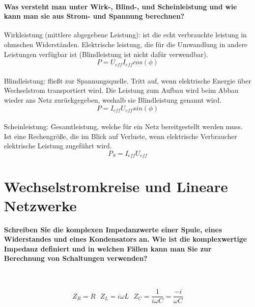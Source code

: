 \documentclass[a4paper, 11pt, parskip=half]{scrartcl}
\begin{document}
\paragraph{Was versteht man unter Wirk-, Blind-, und Scheinleistung und wie kann man sie aus Strom-
und Spannung berechnen?}

Wirkleistung (mittlere abgegebene Leistung): ist die echt verbrauchte leistung in ohmschen Widerständen.  Elektrische leistung, die für die Umwandlung in andere Leistungen verfügbar ist (Blindleistung ist nicht dafür verwendbar). \\
\begin{equation}
P = U_{eff} I_{eff} cos(\phi)
\end{equation}\\

Blindleistung: fließt zur Spannungsquelle. Tritt auf, wenn elektrische Energie über Wechselstrom transportiert wird. Die Leistung zum Aufbau wird beim Abbau wieder ans Netz zurückgegeben, weshalb sie Blindleistung genannt wird.\\
\begin{equation}
P = I_{eff} U_{eff} sin(\phi)
\end{equation}\\

Scheinleistung: Gesamtleistung, welche für ein Netz bereitgestellt werden muss.  Ist eine Rechengröße, die im Blick auf Verluste, wenn elektrische Verbraucher elektrische Leistung zugeführt wird.\\
\begin{equation}
P_S = I_{eff} U_{eff}
\end{equation}

\newpage

\newpage

\section{Wechselstromkreise und Lineare Netzwerke}

\paragraph{Schreiben Sie die komplexen Impedanzwerte einer Spule, eines Widerstandes und eines
Kondensators an. Wie ist die komplexwertige Impedanz definiert und in welchen Fällen kann man Sie
zur Berechnung von Schaltungen verwenden?} ~

\begin{equation}
    Z_R = R ~~~ Z_L = i \omega L ~~~ Z_C = \frac{1}{i \omega C} = \frac{-i}{\omega C}
\end{equation}
\end{document}
